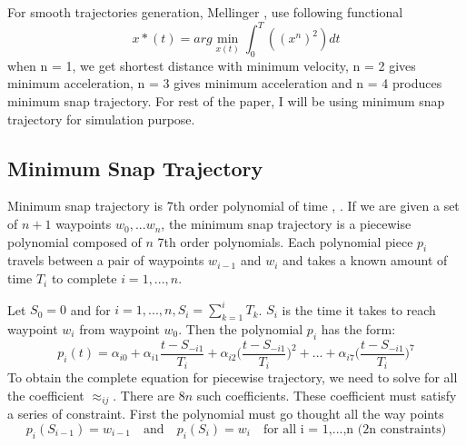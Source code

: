 \documentclass[conference,onecolumn,10pt]{IEEEtran}
\begin{document}
For smooth trajectories generation, Mellinger \cite{mellinger2011minimum}, use following functional 
\begin{equation}
\label{opt}
x*(t) = arg \min_{x(t)} \int_0^T(({x^n})^2)dt
\end{equation}
when n = 1, we get shortest distance with minimum velocity, n = 2 gives minimum acceleration, n = 3 gives minimum acceleration and n = 4 produces minimum snap trajectory. For rest of the paper, I will be using minimum snap trajectory for simulation purpose. 

\subsection{Minimum Snap Trajectory}

Minimum snap trajectory is 7th order polynomial of time \cite{AerialRobotics}, \cite{mellinger2011minimum}. If we are given a set of $n+1$ waypoints $w_0,...w_n$, the minimum snap trajectory is a piecewise polynomial composed of $n$ 7th order polynomials. Each polynomial piece $p_i$ travels between a pair of waypoints $w_{i-1}$ and $w_i$ and takes a known amount of time $T_i$ to complete $i = 1,...,n$. 

Let $S_0 = 0$ and for $i = 1,...,n, S_i = \sum_{k=1}^{i}T_k$. $S_i$ is the time it takes to reach waypoint $w_i$ from waypoint $w_0$. Then the polynomial $p_i$ has the form: 
\begin{equation}
p_i(t) = \alpha_{i0} + \alpha_{i1}\frac{t-S_{-i1}}{T_i} +\alpha_{i2}\Big(\frac{t-S_{-i1}}{T_i}\Big)^2 + ...+ \alpha_{i7}\Big(\frac{t-S_{-i1}}{T_i}\Big)^7
\end{equation}
To obtain the complete equation for piecewise trajectory, we need to solve for all the coefficient $\approx_{ij}$. There are $8n$ such coefficients. These coefficient must satisfy a series of constraint. First the polynomial must go thought all the way points 
\begin{equation}
p_i(S_{i-1}) = w_{i-1} \quad \text{and} \quad p_i(S_i) = w_i \quad \text{for all i = 1,...,n (2n constraints)}
\end{equation}
\end{document}

